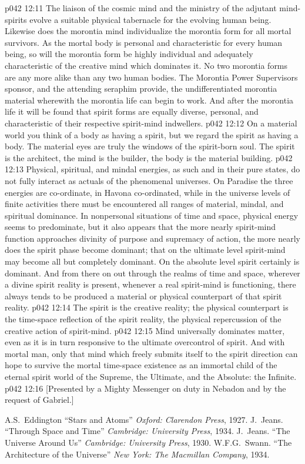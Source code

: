 \vs p042 12:11 The liaison of the cosmic mind and the ministry of the adjutant mind\hyp{}spirits evolve a suitable physical tabernacle for the evolving human being. Likewise does the morontia mind individualize the morontia form for all mortal survivors. As the mortal body is personal and characteristic for every human being, so will the morontia form be highly individual and adequately characteristic of the creative mind which dominates it. No two morontia forms are any more alike than any two human bodies. The Morontia Power Supervisors sponsor, and the attending seraphim provide, the undifferentiated morontia material wherewith the morontia life can begin to work. And after the morontia life it will be found that spirit forms are equally diverse, personal, and characteristic of their respective spirit\hyp{}mind indwellers.
\vs p042 12:12 \pc On a material world you think of a body as having a spirit, but we regard the spirit as having a body. The material eyes are truly the windows of the spirit\hyp{}born soul. The spirit is the architect, the mind is the builder, the body is the material building.
\vs p042 12:13 \pc Physical, spiritual, and mindal energies, as such and in their pure states, do not fully interact as actuals of the phenomenal universes. On Paradise the three energies are co\hyp{}ordinate, in Havona co\hyp{}ordinated, while in the universe levels of finite activities there must be encountered all ranges of material, mindal, and spiritual dominance. In nonpersonal situations of time and space, physical energy seems to predominate, but it also appears that the more nearly spirit\hyp{}mind function approaches divinity of purpose and supremacy of action, the more nearly does the spirit phase become dominant; that on the ultimate level spirit\hyp{}mind may become all but completely dominant. On the absolute level spirit certainly is dominant. And from there on out through the realms of time and space, wherever a divine spirit reality is present, whenever a real spirit\hyp{}mind is functioning, there always tends to be produced a material or physical counterpart of that spirit reality.
\vs p042 12:14 The spirit is the creative reality; the physical counterpart is the time\hyp{}space reflection of the spirit reality, the physical repercussion of the creative action of spirit\hyp{}mind.
\vs p042 12:15 Mind universally dominates matter, even as it is in turn responsive to the ultimate overcontrol of spirit. And with mortal man, only that mind which freely submits itself to the spirit direction can hope to survive the mortal time\hyp{}space existence as an immortal child of the eternal spirit world of the Supreme, the Ultimate, and the Absolute: the Infinite.
\vsetoff
\vs p042 12:16 [Presented by a Mighty Messenger on duty in Nebadon and by the request of Gabriel.]
\quizlink
\begin{thebibliography}{100}
A.S.~Eddington
{``Stars and Atoms''}
{\em Oxford: Clarendon Press}, 1927.
J.~Jeans.
{``Through Space and Time''}
{\em Cambridge: University Press}, 1934.
J.~Jeans.
{``The Universe Around Us''}
{\em Cambridge: University Press}, 1930.
W.F.G.~Swann.
{``The Architecture of the Universe''}
{\em New York: The Macmillan Company}, 1934.
\end{thebibliography}
